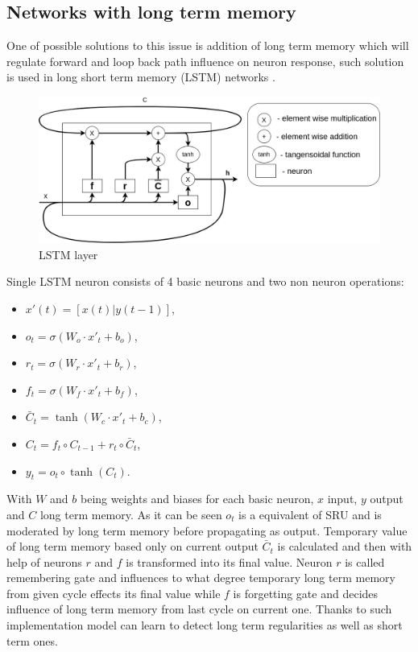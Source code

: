 \subsection{Networks with long term memory}
One of possible solutions to this issue is addition of long term memory which will regulate
forward and loop back path influence on neuron response, such solution is used in long short
term memory (LSTM) networks \cite{Hochreiter1997}.
\begin{figure}[htb] 
	\label{fig:lstm}
	\includegraphics[width=\textwidth]{figures/lstm}
	\caption{LSTM layer}
\end{figure}
Single LSTM neuron consists of 4 basic neurons and two non neuron operations:
\begin{itemize}
\item $x'(t)=[x(t)|y(t-1)]$,
\item $o_t=\sigma (W_o\cdot x'_t+b_o)$,
\item $r_t=\sigma (W_r\cdot x'_t+b_r)$,
\item $f_t=\sigma (W_f\cdot x'_t+b_f)$,
\item $\bar{C}_t=\tanh (W_c\cdot x'_t+b_c)$,
\item $C_t=f_t\circ C_{t-1}+r_t\circ \bar{C}_t$,
\item $y_t=o_t\circ \tanh (C_t)$.
\end{itemize}
With $W$ and $b$ being weights and biases for each basic neuron, $x$ input, $y$ output and
$C$ long term memory. As it can be seen $o_t$ is a equivalent of SRU and is moderated by
long term memory before propagating as output. Temporary value of long term memory based
only on current output $\bar{C}_t$ is calculated and then with help of neurons $r$ and $f$
is transformed into its final value.
Neuron $r$ is called remembering gate and influences to what degree temporary long term
memory from given cycle effects its final value while $f$ is forgetting gate and
decides influence of long term memory from last cycle on current one.
Thanks to such implementation model can learn to detect long term regularities as well
as short term ones.

